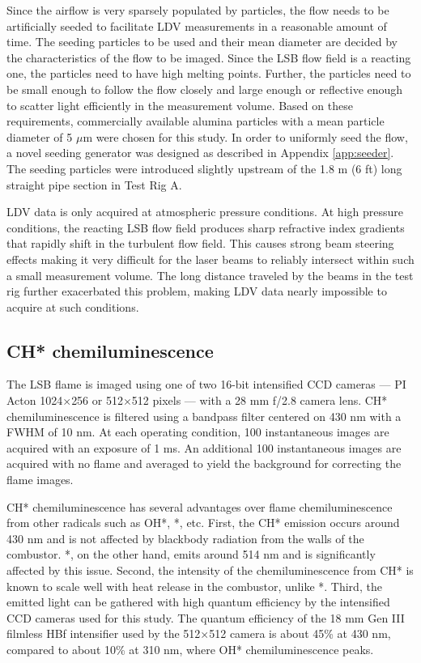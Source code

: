 Since the airflow is very sparsely populated by particles, the flow needs to be artificially seeded to facilitate LDV measurements in a reasonable amount of time.
The seeding particles to be used and their mean diameter are decided by the characteristics of the flow to be imaged.
Since the LSB flow field is a reacting one, the particles need to have high melting points.
Further, the particles need to be small enough to follow the flow closely and large enough or reflective enough to scatter light efficiently in the measurement volume.
Based on these requirements, commercially available alumina particles with a mean particle diameter of 5 \(\mu\)m were chosen for this study.
In order to uniformly seed the flow, a novel seeding generator was designed as described in Appendix \ref{app:seeder}.
The seeding particles were introduced slightly upstream of the 1.8 m (6 ft) long straight pipe section in Test Rig A.

LDV data is only acquired at atmospheric pressure conditions.
At high pressure conditions, the reacting LSB flow field produces sharp refractive index gradients that rapidly shift in the turbulent flow field.
This causes strong beam steering effects making it very difficult for the laser beams to reliably intersect within such a small measurement volume.
The long distance traveled by the beams in the test rig further exacerbated this problem, making LDV data nearly impossible to acquire at such conditions.

\subsection{CH* chemiluminescence}

The LSB flame is imaged using one of two 16-bit intensified CCD cameras --- PI Acton 1024\(\times\)256 or 512\(\times\)512 pixels --- with a 28 mm f/2.8 camera lens.
CH* chemiluminescence is filtered using a bandpass filter centered on 430 nm with a FWHM of 10 nm.
At each operating condition, 100 instantaneous images are acquired with an exposure of 1 ms.
An additional 100 instantaneous images are acquired with no flame and averaged to yield the background for correcting the flame images.

CH* chemiluminescence has several advantages over flame chemiluminescence from other radicals such as OH*, *, etc.
First, the CH* emission occurs around 430 nm and is not affected by blackbody radiation from the walls of the combustor.
*, on the other hand, emits around 514 nm and is significantly affected by this issue.
Second, the intensity of the chemiluminescence from CH* is known to scale well with heat release in the combustor\cite{2006-hardalupas}, unlike *.
Third, the emitted light can be gathered with high quantum efficiency by the intensified CCD cameras used for this study.
The quantum efficiency of the 18 mm Gen III filmless HBf intensifier used by the 512\(\times\)512 camera is about 45\% at 430 nm, compared to about 10\% at 310 nm, where OH* chemiluminescence peaks.

